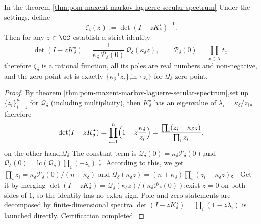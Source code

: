 \begin{corollary}\label{cor:pom-maxent-markov-zeta-determinant-single-polynomial}
In the theorem \ref{thm:pom-maxent-markov-laguerre-secular-spectrum} Under the settings, define
\[
\zeta_\delta(z):=\det(I-zK^\star_\delta)^{-1}.
\]
Then for any \(z\in\CC\) establish a strict identity
\[
\det(I-zK^\star_\delta)=\frac{1}{\kappa_\delta\,\mathcal P_\delta(0)}\,\mathcal Q_\delta(\kappa_\delta z),
\qquad
\mathcal P_\delta(0)=\prod_{x\in X}t_x.
\]
therefore \(\zeta_\delta\) is a rational function, all its poles are real numbers and non-negative, and the zero point set is exactly \(\{\kappa_\delta^{-1}z_i\}\),in \(\{z_i\}\) for \(\mathcal Q_\delta\) zero point.
\end{corollary}
\begin{proof}
By theorem \ref{thm:pom-maxent-markov-laguerre-secular-spectrum},set up \(\{z_i\}_{i=1}^n\) for \(\mathcal Q_\delta\) (including multiplicity), then \(K^\star_\delta\) has an eigenvalue of \(\lambda_i=\kappa_\delta/z_i\)。
therefore
\[
\det(I-zK^\star_\delta)=\prod_{i=1}^n\Bigl(1-z\frac{\kappa_\delta}{z_i}\Bigr)=\frac{\prod_i(z_i-\kappa_\delta z)}{\prod_i z_i}.
\]
on the other hand,\(\mathcal Q_\delta\) The constant term is \(\mathcal Q_\delta(0)=\kappa_\delta\mathcal P_\delta(0)\),and \(\mathcal Q_\delta(0)=\mathrm{lc}(\mathcal Q_\delta)\prod_i(-z_i)\)；
According to this, we get \(\prod_i z_i=\kappa_\delta\mathcal P_\delta(0)/(n+\kappa_\delta)\) and
\(
\mathcal Q_\delta(\kappa_\delta z)=(n+\kappa_\delta)\prod_i(z_i-\kappa_\delta z)
\)。
Get it by merging \(\det(I-zK^\star_\delta)=\mathcal Q_\delta(\kappa_\delta z)/(\kappa_\delta\mathcal P_\delta(0))\);exist \(z=0\) on both sides of \(1\), so the identity has no extra sign.
Pole and zero statements are decomposed by finite-dimensional spectra \(\det(I-zK^\star_\delta)=\prod_i(1-z\lambda_i)\) is launched directly. Certification completed.
\end{proof}

